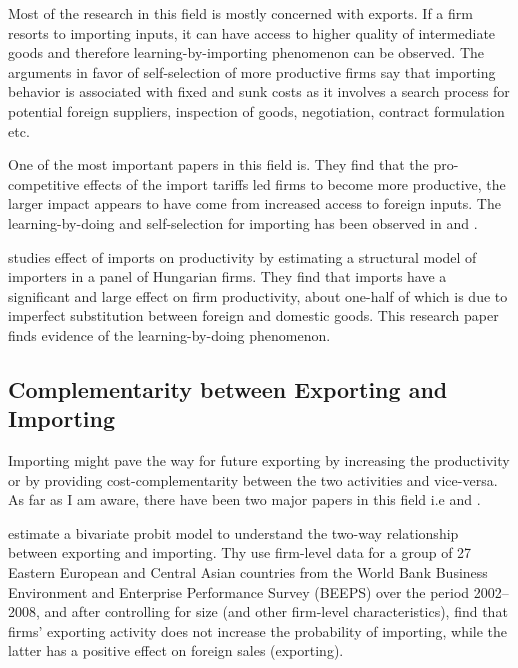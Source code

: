 \documentclass[12pt]{article}
\begin{document}
Most of the research in this field is mostly concerned with exports.
If a firm resorts to importing inputs, it can have access to
higher quality of intermediate goods and therefore
learning-by-importing phenomenon can be observed. 
The arguments in favor of self-selection of more productive firms say
that importing behavior is associated with  fixed and
sunk costs as it involves a search process for
potential foreign suppliers, inspection of goods, negotiation, contract formulation
etc.  

One of the most important papers in this field
is\textcite{topalova2011trade}. They find that the pro-competitive
effects of the import tariffs led firms to become more
productive, the larger impact appears to have come from 
increased access to foreign inputs. The learning-by-doing and
self-selection for importing has  been observed in
\textcite{muuls2009imports} and \textcite{kasahara2008does}. 

\textcite{halpern2011imported} studies effect of imports on productivity by estimating a structural
model of importers in a panel of Hungarian firms. They find that imports have
a significant and large effect on firm productivity, about one-half of which is due
to imperfect substitution between foreign and domestic goods. This
research paper finds evidence of the learning-by-doing phenomenon. 

\subsection*{Complementarity between Exporting and Importing}

Importing  might pave the way for future
exporting by increasing the productivity or by providing
cost-complementarity between the two activities and vice-versa. 
As far as I am aware, there have been two major papers in this field
i.e \textcite{aristei2013firms} and \textcite{kasahara2013productivity}. 

\textcite{aristei2013firms} estimate a bivariate probit model to
understand the two-way relationship between exporting and importing. 
Thy use  firm-level data for a group of 27 Eastern European and 
Central Asian countries from the World Bank Business Environment 
and Enterprise Performance Survey (BEEPS) over the period 2002–2008, 
and after controlling for size (and other firm-level characteristics),
find that firms’ exporting activity does not increase the
probability of importing, while the latter has a positive effect
 on foreign sales (exporting). 
\end{document}
